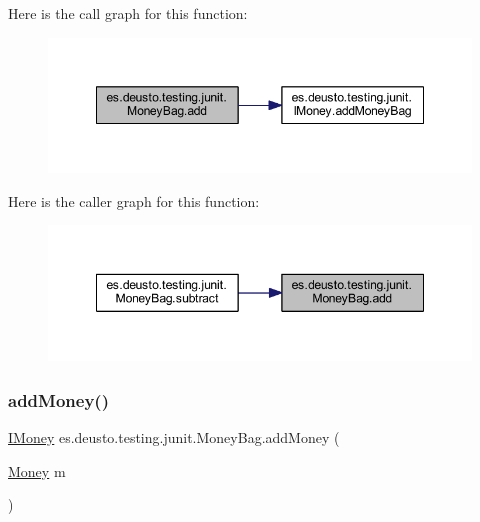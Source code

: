 Here is the call graph for this function\+:
\nopagebreak
\begin{figure}[H]
\begin{center}
\leavevmode
\includegraphics[width=348pt]{classes_1_1deusto_1_1testing_1_1junit_1_1_money_bag_ab3be83ff12fa6d19b67b669194120d00_cgraph}
\end{center}
\end{figure}
Here is the caller graph for this function\+:
\nopagebreak
\begin{figure}[H]
\begin{center}
\leavevmode
\includegraphics[width=348pt]{classes_1_1deusto_1_1testing_1_1junit_1_1_money_bag_ab3be83ff12fa6d19b67b669194120d00_icgraph}
\end{center}
\end{figure}
\mbox{\label{classes_1_1deusto_1_1testing_1_1junit_1_1_money_bag_a06ecedbf53ba09d34276fe177e3169bc}} 
\subsubsection{\texorpdfstring{addMoney()}{addMoney()}}
{\footnotesize\ttfamily \mbox{\hyperlink{interfacees_1_1deusto_1_1testing_1_1junit_1_1_i_money}{I\+Money}} es.\+deusto.\+testing.\+junit.\+Money\+Bag.\+add\+Money (\begin{DoxyParamCaption}\item[{\mbox{\hyperlink{classes_1_1deusto_1_1testing_1_1junit_1_1_money}{Money}}}]{m }\end{DoxyParamCaption})}


